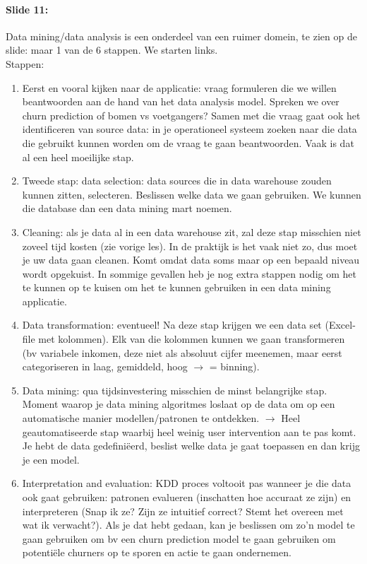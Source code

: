 \documentclass[10pt,a4paper]{report}
\begin{document}
\paragraph{Slide 11:}Data mining/data analysis is een onderdeel van een ruimer domein, te zien op de slide: maar 1 van de 6 stappen. We starten links. \\
Stappen:
\begin{enumerate}
\item Eerst en vooral kijken naar de applicatie: vraag formuleren die we willen beantwoorden aan de hand van het data analysis model. Spreken we over churn prediction of bomen vs voetgangers? Samen met die vraag gaat ook het identificeren van source data: in je operationeel systeem zoeken naar die data die gebruikt kunnen worden om de vraag te gaan beantwoorden. Vaak is dat al een heel moeilijke stap. 	
\item Tweede stap: data selection: data sources die in data warehouse zouden kunnen zitten, selecteren. Beslissen welke data we gaan gebruiken. We kunnen die database dan een data mining mart noemen.
\item Cleaning: als je data al in een data warehouse zit, zal deze stap misschien niet zoveel tijd kosten (zie vorige les). In de praktijk is het vaak niet zo, dus moet je uw data gaan cleanen. Komt omdat data soms maar op een bepaald niveau wordt opgekuist. In sommige gevallen heb je nog extra stappen nodig om het te kunnen op te kuisen om het te kunnen gebruiken in een data mining applicatie.
\item Data transformation: eventueel! Na deze stap krijgen we een data set (Excel-file met kolommen). Elk van die kolommen kunnen we gaan transformeren (bv variabele inkomen, deze niet als absoluut cijfer meenemen, maar eerst categoriseren in laag, gemiddeld, hoog $\rightarrow$ = binning).
\item Data mining: qua tijdsinvestering misschien de minst belangrijke stap. Moment waarop je data mining algoritmes loslaat op de data om op een automatische manier modellen/patronen te ontdekken. $\rightarrow$ Heel geautomatiseerde stap waarbij heel weinig user intervention aan te pas komt. Je hebt de data gedefini\"eerd, beslist welke data je gaat toepassen en dan krijg je een model.
\item Interpretation and evaluation: KDD proces voltooit pas wanneer je die data ook gaat gebruiken: patronen evalueren (inschatten hoe accuraat ze zijn) en interpreteren (Snap ik ze? Zijn ze intuitief correct? Stemt het overeen met wat ik verwacht?). Als je dat hebt gedaan, kan je beslissen om zo'n model te gaan gebruiken om bv een churn prediction model te gaan gebruiken om potenti\"ele churners op te sporen en actie te gaan ondernemen. 
\end{enumerate}
\end{document}
